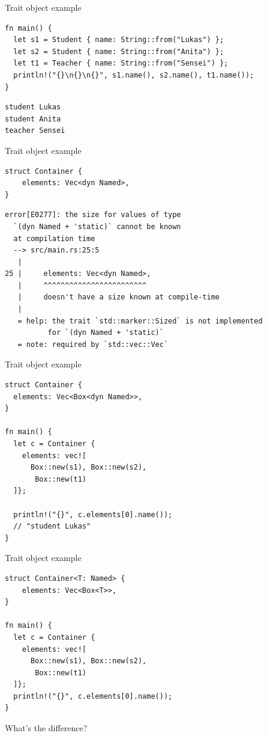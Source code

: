 \documentclass{beamer}
\begin{document}
\begin{frame}[fragile]{Trait object example}
  \begin{verbatim}
fn main() {
  let s1 = Student { name: String::from("Lukas") };
  let s2 = Student { name: String::from("Anita") };
  let t1 = Teacher { name: String::from("Sensei") };
  println!("{}\n{}\n{}", s1.name(), s2.name(), t1.name());
}
  \end{verbatim}
  \begin{verbatim}
student Lukas
student Anita
teacher Sensei
  \end{verbatim}
\end{frame}

\begin{frame}[fragile]{Trait object example}
  \begin{verbatim}
struct Container {
    elements: Vec<dyn Named>,
}
  \end{verbatim}
  \begin{verbatim}
error[E0277]: the size for values of type
  `(dyn Named + 'static)` cannot be known
  at compilation time
  --> src/main.rs:25:5
   |
25 |     elements: Vec<dyn Named>,
   |     ^^^^^^^^^^^^^^^^^^^^^^^^
   |     doesn't have a size known at compile-time
   |
   = help: the trait `std::marker::Sized` is not implemented
          for `(dyn Named + 'static)`
   = note: required by `std::vec::Vec`
  \end{verbatim}
\end{frame}

\begin{frame}[fragile]{Trait object example}
  \begin{verbatim}
struct Container {
  elements: Vec<Box<dyn Named>>,
}

fn main() {
  let c = Container {
    elements: vec![
      Box::new(s1), Box::new(s2),
       Box::new(t1)
  ]};
  
  println!("{}", c.elements[0].name());
  // "student Lukas"
}
\end{verbatim}
\end{frame}

\begin{frame}[fragile]{Trait object example}
  \begin{verbatim}
struct Container<T: Named> {
    elements: Vec<Box<T>>,
}

fn main() {
  let c = Container {
    elements: vec![
      Box::new(s1), Box::new(s2),
       Box::new(t1)
  ]};
  println!("{}", c.elements[0].name());
}
\end{verbatim}
  What's the difference?
\end{frame}
\end{document}
